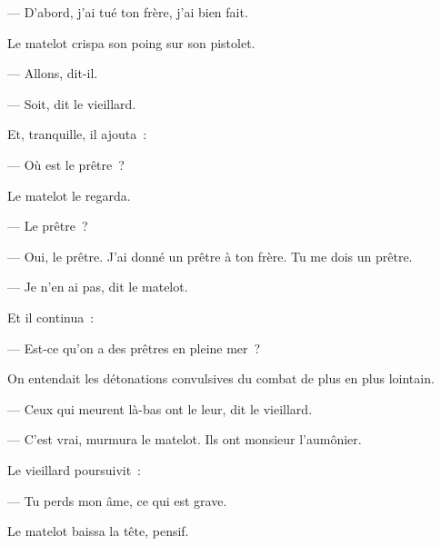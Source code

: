 \documentclass[french,twoside]{book} %
\begin{document}
— D’abord, j’ai tué ton frère, j’ai bien fait.\par
Le matelot crispa son poing sur son pistolet.\par
— Allons, dit-il.\par
— Soit, dit le vieillard.\par
Et, tranquille, il ajouta :\par
— Où est le prêtre ?\par
Le matelot le regarda.\par
— Le prêtre ?\par
— Oui, le prêtre. J’ai donné un prêtre à ton frère. Tu me dois un prêtre.\par
— Je n’en ai pas, dit le matelot.\par
Et il continua :\par
— Est-ce qu’on a des prêtres en pleine mer ?\par
On entendait les détonations convulsives du combat de plus en plus lointain.\par
— Ceux qui meurent là-bas ont le leur, dit le vieillard.\par
— C’est vrai, murmura le matelot. Ils ont monsieur l’aumônier.\par
Le vieillard poursuivit :\par
— Tu perds mon âme, ce qui est grave.\par
Le matelot baissa la tête, pensif.\par
\end{document}
